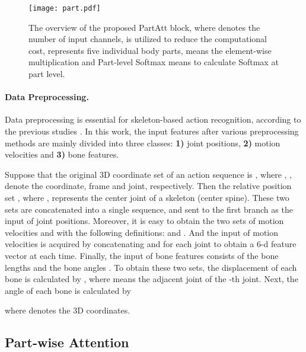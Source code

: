 \documentclass[sigconf]{acmart}
\begin{document}
\begin{figure*}
  \centerline{\texttt{[image: part.pdf]}}
  \vspace{-0.4cm}
  \caption{The overview of the proposed PartAtt block, where  denotes the number of input channels,  is utilized to reduce the computational cost,  represents five individual body parts,  means the element-wise multiplication and Part-level Softmax means to calculate Softmax at part level. \bv}\label{fig:part}
\end{figure*}

\paragraph{Data Preprocessing.} Data preprocessing is essential for skeleton-based action recognition, according to the previous studies \cite{song2019richly, si2018skeleton, shi2019two}. In this work, the input features after various preprocessing methods are mainly divided into three classes: {\bf 1)} joint positions, {\bf 2)} motion velocities and {\bf 3)} bone features.

Suppose that the original 3D coordinate set of an action sequence is , where , ,  denote the coordinate, frame and joint, respectively. Then the relative position set , where ,  represents the center joint of a skeleton (center spine). These two sets are concatenated into a single sequence, and sent to the first branch as the input of joint positions. Moreover, it is easy to obtain the two sets of motion velocities  and  with the following definitions:  and . And the input of motion velocities is acquired by concatenating  and  for each joint to obtain a 6-d feature vector at each time. Finally, the input of bone features consists of the bone lengths  and the bone angles . To obtain these two sets, the displacement of each bone is calculated by , where  means the adjacent joint of the -th joint. Next, the angle of each bone is calculated by

where  denotes the 3D coordinates.

\subsection{Part-wise Attention}
\label{ssec:pa}
\end{document}
